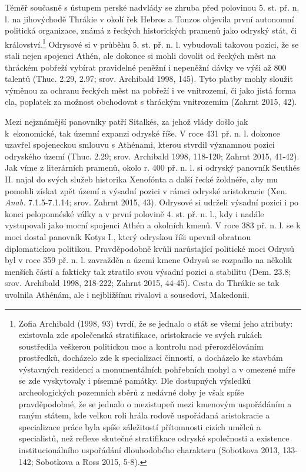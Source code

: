 Téměř současně s ústupem perské nadvlády se zhruba před polovinou 5. st. př. n. l. na jihovýchodě Thrákie v okolí řek Hebros a Tonzos objevila první autonomní politická organizace, známá z řeckých historických pramenů jako odryský stát, či království.\footnote{Zofia Archibald (1998, 93) tvrdí, že se jednalo o stát se všemi jeho atributy: existovala zde společenská stratifikace, aristokracie ve svých rukách soustředila veškerou politickou moc a kontrolu nad přerozdělováním prostředků, docházelo zde k specializaci činností, a docházelo ke stavbám výstavných rezidencí a monumentálních pohřebních mohyl a v omezené míře se zde vyskytovaly i písemné památky. Dle dostupných výsledků archeologických pozemních sběrů z nedávné doby je však spíše pravděpodobné, že se jednalo o mezistupeň mezi kmenovým uspořádáním a raným státem, kde velkou roli hrála rodově uspořádaná aristokracie a specializace práce byla spíše záležitostí přítomnosti cizích umělců a specialistů, než reflexe skutečné stratifikace odryské společnosti a existence institucionálního uspořádání dlouhodobého charakteru (Sobotkova 2013, 133-142; Sobotkova a Ross 2015, 5-8).} Odrysové si v průběhu 5. st. př. n. l. vybudovali takovou pozici, že se stali nejen spojenci Athén, ale dokonce si mohli dovolit od řeckých měst na thráckém pobřeží vybírat pravidelné peněžní i nepeněžní dávky ve výši až 800 talentů (Thuc. 2.29, 2.97; srov. Archibald 1998, 145). Tyto platby mohly sloužit výměnou za ochranu řeckých měst na pobřeží i ve vnitrozemí, či jako jistá forma cla, poplatek za možnost obchodovat s thráckým vnitrozemím (Zahrnt 2015, 42).

Mezi nejznámější panovníky patří Sitalkés, za jehož vlády došlo jak k~ekonomické, tak územní expanzi odryské říše. V roce 431 př. n. l. dokonce uzavřel spojeneckou smlouvu s Athénami, kterou stvrdil významnou pozici odryského území (Thuc. 2.29; srov. Archibald 1998, 118-120; Zahrnt 2015, 41-42). Jak víme z literárních pramenů, okolo r. 400 př. n. l. si odryský panovník Seuthés II. najal do svých služeb historika Xenofónta a další řecké žoldnéře, aby mu pomohli získat zpět území a výsadní pozici v rámci odryské aristokracie (Xen. {\em Anab.} 7.1.5-7.1.14; srov. Zahrnt 2015, 43). Odrysové si udrželi výsadní pozici i po konci peloponnéské války a v první polovině 4. st. př. n. l., kdy i nadále vystupovali jako mocní spojenci Athén a okolních kmenů. V roce 383 př. n. l. se k moci dostal panovník Kotys I., který odryskou říši upevnil obratnou diplomatickou politikou. Pravděpodobně kvůli narůstající politické moci Odrysů byl v roce 359 př. n. l. zavražděn a území kmene Odrysů se rozpadlo na několik menších částí a fakticky tak ztratilo svou výsadní pozici a stabilitu (Dem. 23.8; srov. Archibald 1998, 218-222; Zahrnt 2015, 44-45). Cesta do Thrákie se tak uvolnila Athénám, ale i nejbližšímu rivalovi a sousedovi, Makedonii.


